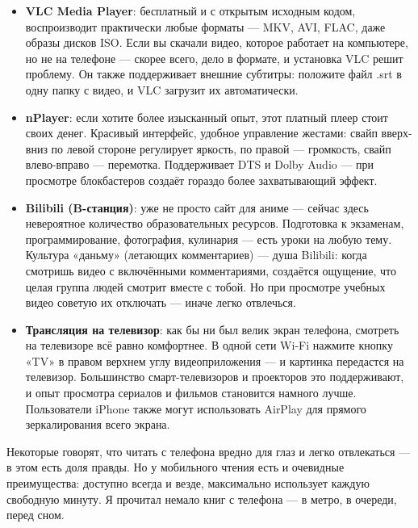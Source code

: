 \begin{itemize}
  \item \textbf{VLC Media Player}: бесплатный и с открытым исходным кодом, воспроизводит практически любые форматы — MKV, AVI, FLAC, даже образы дисков ISO. Если вы скачали видео, которое работает на компьютере, но не на телефоне — скорее всего, дело в формате, и установка VLC решит проблему. Он также поддерживает внешние субтитры: положите файл .srt в одну папку с видео, и VLC загрузит их автоматически.
  \item \textbf{nPlayer}: если хотите более изысканный опыт, этот платный плеер стоит своих денег. Красивый интерфейс, удобное управление жестами: свайп вверх-вниз по левой стороне регулирует яркость, по правой — громкость, свайп влево-вправо — перемотка. Поддерживает DTS и Dolby Audio — при просмотре блокбастеров создаёт гораздо более захватывающий эффект.
  \item \textbf{Bilibili (B-станция)}: уже не просто сайт для аниме — сейчас здесь невероятное количество образовательных ресурсов. Подготовка к экзаменам, программирование, фотография, кулинария — есть уроки на любую тему. Культура «даньму» (летающих комментариев) — душа Bilibili: когда смотришь видео с включёнными комментариями, создаётся ощущение, что целая группа людей смотрит вместе с тобой. Но при просмотре учебных видео советую их отключать — иначе легко отвлечься.
  \item \textbf{Трансляция на телевизор}: как бы ни был велик экран телефона, смотреть на телевизоре всё равно комфортнее. В одной сети Wi-Fi нажмите кнопку «TV» в правом верхнем углу видеоприложения — и картинка передастся на телевизор. Большинство смарт-телевизоров и проекторов это поддерживают, и опыт просмотра сериалов и фильмов становится намного лучше. Пользователи iPhone также могут использовать AirPlay для прямого зеркалирования всего экрана.
\end{itemize}


Некоторые говорят, что читать с телефона вредно для глаз и легко отвлекаться — в этом есть доля правды. Но у мобильного чтения есть и очевидные преимущества: доступно всегда и везде, максимально использует каждую свободную минуту. Я прочитал немало книг с телефона — в метро, в очереди, перед сном.

